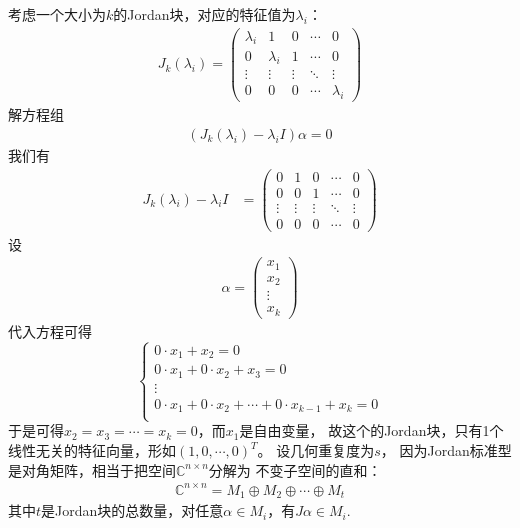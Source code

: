 \documentclass{article}
\begin{document}
考虑一个大小为$k$的Jordan块，对应的特征值为$\lambda_i$：
\begin{align*}
  J_k(\lambda_i) = \begin{pmatrix}
                     \lambda_i & 1         & 0      & \cdots & 0         \\
                     0         & \lambda_i & 1      & \cdots & 0         \\
                     \vdots    & \vdots    & \vdots & \ddots & \vdots    \\
                     0         & 0         & 0      & \cdots & \lambda_i
                   \end{pmatrix}
\end{align*}
解方程组
\begin{align*}
  (J_k(\lambda_i) - \lambda_i I) \alpha = 0
\end{align*}
我们有
\begin{align*}
  J_k(\lambda_i) - \lambda_i I
   & = \begin{pmatrix}
         0      & 1      & 0      & \cdots & 0      \\
         0      & 0      & 1      & \cdots & 0      \\
         \vdots & \vdots & \vdots & \ddots & \vdots \\
         0      & 0      & 0      & \cdots & 0
       \end{pmatrix}
\end{align*}
设
\begin{align*}
  \alpha = \begin{pmatrix}
             x_1    \\
             x_2    \\
             \vdots \\
             x_k
           \end{pmatrix}
\end{align*}
代入方程可得
\begin{equation*}
  \begin{cases}
    0 \cdot x_1 + x_2 = 0                                             \\
    0 \cdot x_1 + 0 \cdot x_2 + x_3 = 0                               \\
    \vdots                                                            \\
    0 \cdot x_1 + 0 \cdot x_2 + \cdots + 0 \cdot x_{k - 1} + x_k  = 0 \\
  \end{cases}
\end{equation*}
于是可得$x_2 = x_3 = \cdots = x_k = 0$，而$x_1$是自由变量，
故这个的Jordan块，只有1个线性无关的特征向量，形如$(1, 0, \cdots, 0)^T$。
设几何重复度为$s$，
因为Jordan标准型是对角矩阵，相当于把空间$\mathbb{C}^{n \times n}$分解为
不变子空间的直和：
\begin{align*}
  \mathbb{C}^{n \times n} = M_1 \oplus M_2 \oplus \cdots \oplus M_t
\end{align*}
其中$t$是Jordan块的总数量，对任意$\alpha \in M_i$，有$J \alpha \in M_i$.
\end{document}
